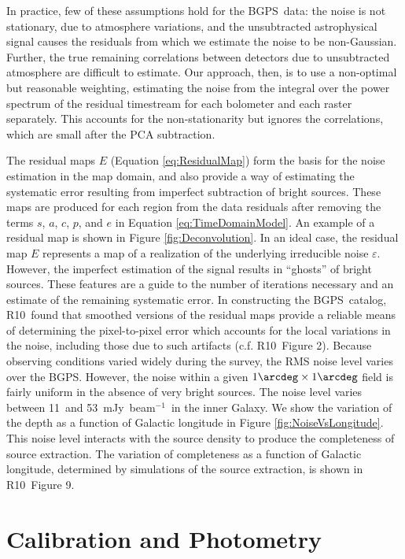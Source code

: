 \documentclass[12pt,preprint]{aastex}
\newcommand\jyb{Jy~beam$^{-1}$}
\newcommand\Ros{R10}
\newcommand{\epsi}{\varepsilon}
\def\bgps{BGPS}
\newcommand{\bgpsdepthlow}{11}
\newcommand{\bgpsdepthhigh}{53}
\begin{document}
In practice, few of these assumptions hold for the \bgps\ data: the
noise is not stationary, due to atmosphere variations, and the
unsubtracted astrophysical signal causes the residuals from which we
estimate the noise to be non-Gaussian.  Further, the true remaining
correlations between detectors due to unsubtracted atmosphere are
difficult to estimate.  Our approach, then, is to use a non-optimal
but reasonable weighting, estimating the noise from the integral over
the power spectrum of the residual timestream for each bolometer and
each raster separately.  This accounts for the non-stationarity but
ignores the correlations, which are small after the PCA subtraction.

The residual maps $E$ (Equation \ref{eq:ResidualMap}) form the basis
for the noise estimation in the map domain, and also provide a way of
estimating the systematic error resulting from imperfect subtraction
of bright sources.  These maps are produced for each region from the
data residuals after removing the terms $s$, $a$, $c$, $p$, and $e$ in
Equation \ref{eq:TimeDomainModel}. An example of a residual map is
shown in Figure \ref{fig:Deconvolution}.  In an ideal case, the
residual map $E$ represents a map of a realization of the underlying
irreducible noise $\epsi$.  However, the imperfect estimation of the
signal results in ``ghosts'' of bright sources.  These features are a
guide to the number of iterations necessary and an estimate of the
remaining systematic error.  In constructing the \bgps\ catalog, \Ros\
found that smoothed versions of the residual maps provide a reliable
means of determining the pixel-to-pixel error which accounts for the
local variations in the noise, including those due to such artifacts
(c.f. \Ros\ Figure 2).  Because observing conditions varied widely
during the survey, the RMS noise level varies over the BGPS.  However,
the noise within a given $1\arcdeg \times 1\arcdeg$ field is fairly
uniform in the absence of very bright sources.  The noise level varies
between \bgpsdepthlow\ and \bgpsdepthhigh\ m\jyb\ in the inner Galaxy.
We show the variation of the depth as a function of Galactic longitude
in Figure \ref{fig:NoiseVsLongitude}.  This noise level interacts with
the source density to produce the completeness of source extraction.
The variation of completeness as a function of Galactic longitude,
determined by simulations of the source extraction, is shown in \Ros\
Figure 9.

\section{Calibration and Photometry}
\label{sec:Calibration}
\end{document}
